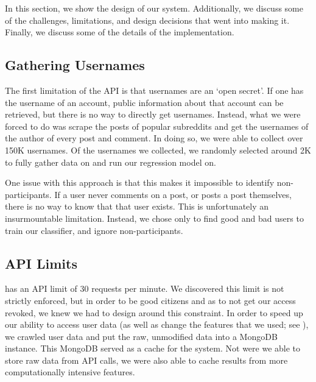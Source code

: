 In this section, we show the design of our system. Additionally, we discuss some
of the challenges, limitations, and design decisions that went into making it.
Finally, we discuss some of the details of the implementation.

\subsection{Gathering \reddit{} Usernames} %
\label{sub:gathering_reddit_usernames}

The first limitation of the \reddit{} API is that usernames are an `open
secret'. If one has the username of an account, public information about that
account can be retrieved, but there is no way to directly get usernames.
Instead, what we were forced to do was scrape the posts of popular subreddits
and get the usernames of the author of every post and comment. In doing so, we
were able to collect over 150K usernames. Of the usernames we collected, we
randomly selected around 2K to fully gather data on and run our regression model
on.

One issue with this approach is that this makes it impossible to identify non-
participants. If a user never comments on a post, or posts a post themselves,
there is no way to know that that user exists. This is unfortunately an
insurmountable limitation. Instead, we chose only to find good and bad users to
train our classifier, and ignore non-participants.


\subsection{\reddit{} API Limits} %
\label{sub:reddit_api_limits}

\reddit{} has an API limit of 30 requests per minute. We discovered this limit
is not strictly enforced, but in order to be good citizens and as to not get our
access revoked, we knew we had to design around this constraint. In order to
speed up our ability to access user data (as well as change the features that we
used; see ), we crawled user data and put the
raw, unmodified data into a MongoDB instance. This MongoDB served as a cache for
the system. Not were we able to store raw data from \reddit{} API calls, we were
also able to cache results from more computationally intensive features.



